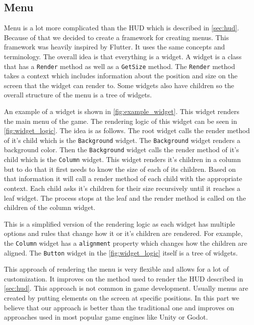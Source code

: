 \subsection{Menu} \label{sec:menu}
Menu is a lot more complicated than the HUD which is described in \autoref*{sec:hud}.
Because of that we decided to create a framework for creating menus.
This framework was heavily inspired by Flutter.
It uses the same concepts and terminology.
The overall idea is that everything is a widget.
A widget is a class that has a \texttt{Render} method as well as a \texttt{GetSize} method.
The \texttt{Render} method takes a context which includes information about the position and size on the screen that the widget can render to.
Some widgets also have children so the overall structure of the menu is a tree of widgets.

An example of a widget is shown in \autoref*{fig:example_widget}.
This widget renders the main menu of the game.
The rendering logic of this widget can be seen in \autoref*{fig:widget_logic}.
The idea is as follows.
The root widget calls the render method of it's child which is the \texttt{Background} widget.
The \texttt{Background} widget renders a background color.
Then the \texttt{Background} widget calls the render method of it's child which is the \texttt{Column} widget.
This widget renders it's children in a column but to do that it first needs to know the size of each of its children.
Based on that information it will call a render method of each child with the appropriate context.
Each child asks it's children for their size recursively until it reaches a leaf widget.
The process stops at the leaf and the render method is called on the children of the column widget.

This is a simplified version of the rendering logic as each widget has multiple options and rules that change how it or it's children are rendered.
For example, the \texttt{Column} widget has a \texttt{alignment} property which changes how the children are aligned.
The \texttt{Button} widget in the \autoref*{fig:widget_logic} itself is a tree of widgets.

This approach of rendering the menu is very flexible and allows for a lot of customization.
It improves on the method used to render the HUD described in \autoref*{sec:hud}.
This approach is not common in game development.
Usually menus are created by putting elements on the screen at specific positions. %
In this part we believe that our approach is better than the traditional one and improves on approaches used in most popular game engines like Unity or Godot.

